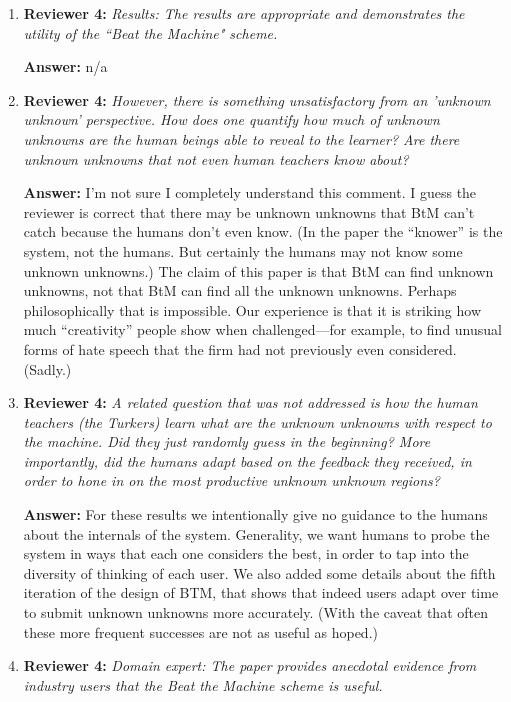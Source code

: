 \documentclass[letterpaper]{article}
\begin{document}
\begin{enumerate}
\item \textbf{Reviewer 4:} \emph{ Results: The results are appropriate and demonstrates the utility of the ``Beat the Machine" scheme.}

\textbf{Answer:} n/a

\item \textbf{Reviewer 4:} \emph{ However, there is something unsatisfactory from an 'unknown unknown' perspective.  How does one quantify how much of unknown unknowns are the human beings able to reveal to the learner?  Are there unknown unknowns that not even human teachers know about?}

\textbf{Answer:} I'm not sure I completely understand this comment.  I guess the reviewer is correct that there may be unknown unknowns that BtM can't catch because the humans don't even know.  (In the paper the ``knower'' is the system, not the humans.  But certainly the humans may not know some unknown unknowns.)  The claim of this paper is that BtM can find unknown unknowns, not that BtM can find all the unknown unknowns.  Perhaps philosophically that is impossible.  Our experience is that it is striking how much ``creativity'' people show when challenged---for example, to find unusual forms of hate speech that the firm had not previously even considered.  (Sadly.) 

\item \textbf{Reviewer 4:} \emph{ A related question that was not addressed is how the human teachers (the Turkers) learn what are the unknown unknowns with respect to the machine.  Did they just randomly guess in the beginning?  More importantly, did the humans adapt based on the feedback they received, in order to hone in on the most productive unknown unknown regions?}

\textbf{Answer:} For these results we intentionally give no guidance to the humans about the internals of the system.  Generality, we want humans to probe the system in ways that each one considers the best, in order to tap into the diversity of thinking of each user. We also added some details about the fifth iteration of the design of BTM, that shows that indeed users adapt over time to submit unknown unknowns more accurately. (With the caveat that often these more frequent successes are not as useful as hoped.)

\item \textbf{Reviewer 4:} \emph{ Domain expert: The paper provides anecdotal evidence from industry users that the Beat the Machine scheme is useful.}


\end{enumerate}
\end{document}
